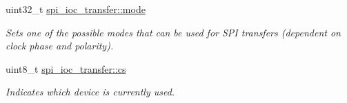 \begin{DoxyCompactItemize}
uint32\+\_\+t \mbox{\hyperlink{group__SPILinux_gaff60beee4311201da16eb1c65c1ad580}{spi\+\_\+ioc\+\_\+transfer\+::mode}}
\begin{DoxyCompactList}\small\item\em Sets one of the possible modes that can be used for S\+PI transfers (dependent on clock phase and polarity). \end{DoxyCompactList}\item 
\mbox{\label{group__SPILinux_gae99061821e81f8f774f2db7ff813be7c}} 
uint8\+\_\+t \mbox{\hyperlink{group__SPILinux_gae99061821e81f8f774f2db7ff813be7c}{spi\+\_\+ioc\+\_\+transfer\+::cs}}
\begin{DoxyCompactList}\small\item\em Indicates which device is currently used. \end{DoxyCompactList}\end{DoxyCompactItemize}
